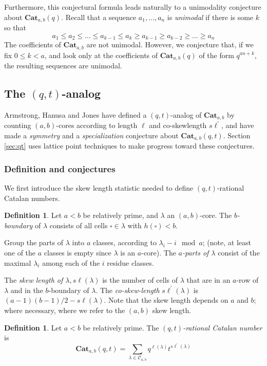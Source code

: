 \documentclass{amsart}[12pt]
\theoremstyle{definition}
\newtheorem{definition}[dummy]{Definition}
\newcommand{\Cat}{\mathbf{Cat}}
\newcommand{\sk}{s\ell}
\begin{document}
Furthermore, this conjectural formula leads naturally to a unimodality conjecture about $\Cat_{a,b}(q)$. Recall that a sequence $a_1,\dots, a_n$ is \emph{unimodal} if there is some $k$ so that $$a_1\leq a_2\leq \dots \leq a_{k-1}\leq a_k \geq a_{k-1} \geq a_{k-2}\geq\dots\geq a_n$$
The coefficients of $\Cat_{a,b}$ are not unimodal. However, we conjecture that, if we fix $0
\leq k <a$, and look only at the coefficients of $\Cat_{a,b}(q)$ of the form $q^{an+k}$, the resulting sequences are unimodal.




\subsection{The \texorpdfstring{$(q,t)$}{(q,t)}-analog}
Armstrong, Hanusa and Jones \cite{AHJ} have defined a $(q,t)$-analog of $\Cat_{a,b}$ by counting $(a,b)$-cores according to length $\ell$ and co-skewlength $\sk^\prime$, and have made a \emph{symmetry} and a \emph{specialization} conjecture about $\Cat_{a,b}(q,t)$. Section \ref{sec:qt} uses lattice point techniques to make progress toward these conjectures.

\subsubsection{Definition and conjectures}
We first introduce the skew length statistic needed to define $(q,t)$-rational Catalan numbers.

\begin{definition}
Let $a<b$ be relatively prime, and $\lambda$ an $(a,b)$-core. The \emph{$b$-boundary} of $\lambda$ consists of all cells $\square\in\lambda$ with $h(\square)<b$.

Group the parts of $\lambda$ into $a$ classes, according to $\lambda_i-i\mod a$; (note, at least one of the $a$ classes is empty since $\lambda$ is an $a$-core). The \emph{$a$-parts of $\lambda$} consist of the maximal $\lambda_i$ among each of the $i$ residue classes.

The \emph{skew length of $\lambda, \sk(\lambda)$} is the number of cells of $\lambda$ that are in an $a$-row of $\lambda$ and in the $b$-boundary of $\lambda$. The \emph{co-skew-length} $\sk^\prime(\lambda)$ is $(a-1)(b-1)/2-\sk(\lambda)$. Note that the skew length depends on $a$ and $b$; where necessary, where we refer to the $(a,b)$ skew length.
\end{definition}

\begin{definition}
Let $a<b$ be relatively prime. The \emph{$(q,t)$-rational Catalan number} is
$$\Cat_{a,b}(q,t)=\sum_{\lambda\in\mathcal{C}_{a,b}} q^{\ell(\lambda)}t^{\sk^\prime(\lambda)}$$
\end{definition}
\end{document}
